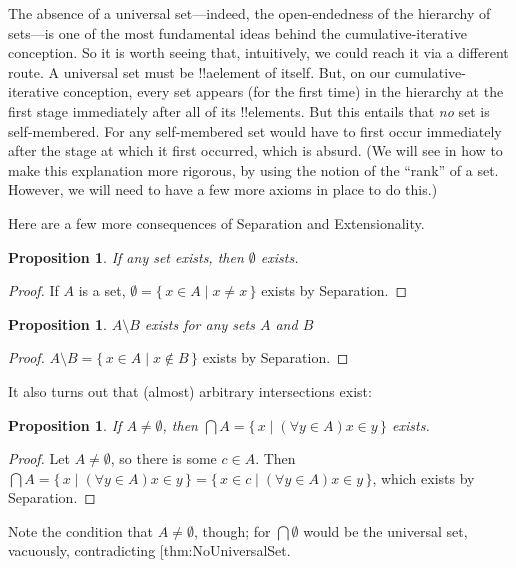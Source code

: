 \documentclass[10pt,a4paper]{article}
\makeatletter
\theoremstyle{plain}
\newtheorem{prop}[thm]{Proposition}
\theoremstyle{definition}
\theoremstyle{remark}
\newcommand*{\ollabel}[1]{\label{#1}}
\newcommand{\olref}{\@ifnextchar[{\olref@i}{\olref@final}}
\def\olref@i[#1]{\@ifnextchar[{\olref@ii}{\olref@final}}
\def\olref@ii[#1]{\@ifnextchar[{\olref@iii}{\olref@final}}
\def\olref@iii[#1]{\olref@final}
\def\olref@final#1{\ref{#1}}
\providecommand{\Setabs}[2]{\{\, #1 \mid #2 \,\}}
\makeatother
\begin{document}
The absence of a universal set---indeed, the open-endedness of the
hierarchy of sets---is one of the most fundamental ideas behind the
cumulative-iterative conception. So it is worth seeing that,
intuitively, we could reach it via a different route. A universal set
must be !!a{element} of itself. But, on our cumulative-iterative
conception, every set appears (for the first time) in the hierarchy at
the first stage immediately after all of its !!{element}s. But this
entails that \emph{no} set is self-membered. For any self-membered set
would have to first occur immediately after the stage at which it
first occurred, which is absurd. (We will see in
\olref[sth][spine][rank]{defnsetrank} how to make this explanation
more rigorous, by using the notion of the ``rank'' of a set. However,
we will need to have a few more axioms in place to do this.)

Here are a few more consequences of Separation and Extensionality.

\begin{prop}\ollabel{prop:emptyexists}
If any set exists, then $\emptyset$ exists.
\end{prop}

\begin{proof}
If $A$ is a set, $\emptyset = \Setabs{x \in A}{x \neq x}$ exists by Separation.
\end{proof}

\begin{prop}
$A \setminus B$ exists for any sets $A$ and $B$
\end{prop}

\begin{proof}
$A \setminus B = \Setabs{x \in A}{x \notin B}$ exists by Separation.
\end{proof}

It also turns out that (almost) arbitrary intersections exist:

\begin{prop}\ollabel{prop:intersectionsexist}
If $A \neq \emptyset$, then $\bigcap A = \Setabs{x}{(\forall y \in A)x \in y}$ exists.
\end{prop}

\begin{proof}
Let $A \neq \emptyset$, so there is some $c \in A$. Then $\bigcap A =
\Setabs{x}{(\forall y \in A)x \in y} = \Setabs{x \in c}{(\forall y \in
A)x \in y}$, which exists by Separation.
\end{proof}

Note the condition that $A \neq \emptyset$, though; for $\bigcap
\emptyset$ would be the universal set, vacuously, contradicting
\olref{thm:NoUniversalSet}.
\end{document}
